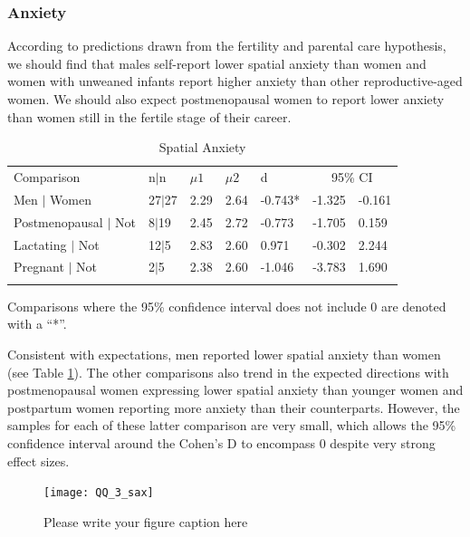 		\subsubsection{Anxiety}
		\label{sec:3.1.2}
According to predictions drawn from the fertility and parental care hypothesis, we should find that males self-report lower spatial anxiety than women and women with unweaned infants report higher anxiety than other reproductive-aged women.  We should also expect postmenopausal women to report lower anxiety than women still in the fertile stage of their career.

\begin{table}[h!]
\caption{Spatial Anxiety}
\label{tab:anx}  
\begin{tabular}{lllllll}
\hline\noalign{\smallskip}
Comparison & \phantom{0}n$|$n & $\mu1$ & $\mu2$ & d & \multicolumn{2}{c}{95\% CI} \\
\noalign{\smallskip}\hline\noalign{\smallskip}
Men $|$ Women & 27$|$27 & 2.29 & 2.64 & -0.743* & -1.325 & -0.161 \\
Postmenopausal $|$ Not & \phantom{0}8$|$19 & 2.45 & 2.72  & -0.773 & -1.705 & \phantom{-}0.159\\
Lactating $|$ Not & 12$|$5 & 2.83 & 2.60 & \phantom{-}0.971 & -0.302 & \phantom{-}2.244 \\
Pregnant $|$ Not & 2$|$5 & 2.38 & 2.60 & -1.046 & -3.783 & \phantom{-}1.690 \\
\noalign{\smallskip}\hline
\end{tabular}\par
\bigskip
Comparisons where the 95\% confidence interval does not include 0 are denoted with a ``*''.
\end{table}		 


Consistent with expectations, men reported lower spatial anxiety than women (see Table \ref{tab:anx}).  The other comparisons also trend in the expected directions with postmenopausal women expressing lower spatial anxiety than younger women and postpartum women reporting more anxiety than their counterparts.  However, the samples for each of these latter comparison are very small, which allows the 95\% confidence interval around the Cohen's D to encompass 0 despite very strong effect sizes.

\begin{figure}[!htb]
  \texttt{[image: QQ\_3\_sax]}
\caption{Please write your figure caption here}
\label{fig:1}       %
\end{figure}



